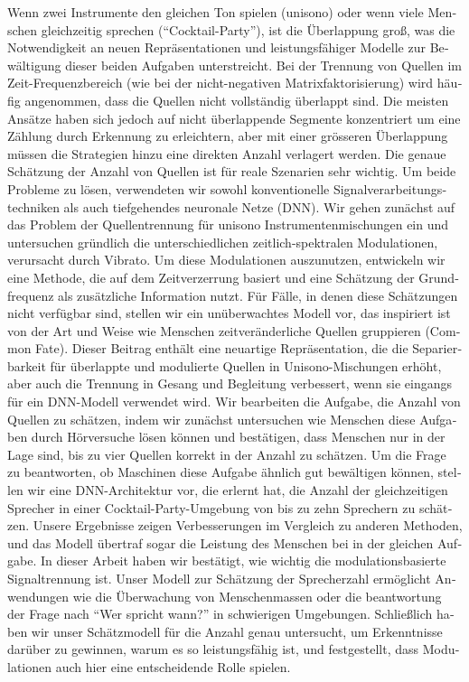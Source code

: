 \begin{otherlanguage}{ngerman}
Wenn zwei Instrumente den gleichen Ton spielen (unisono) oder wenn viele Menschen gleichzeitig sprechen (``Cocktail-Party''), ist die Überlappung groß, was die Notwendigkeit an neuen Repräsentationen und leistungsfähiger Modelle zur Bewältigung dieser beiden Aufgaben unterstreicht.
Bei der Trennung von Quellen im Zeit-Frequenzbereich (wie bei der nicht-negativen Matrixfaktorisierung) wird häufig angenommen, dass die Quellen nicht vollständig überlappt sind.
Die meisten Ansätze haben sich jedoch auf nicht überlappende Segmente konzentriert um eine Zählung durch Erkennung zu erleichtern, aber mit einer grösseren Überlappung müssen die Strategien hinzu eine direkten  Anzahl verlagert werden.
Die genaue Schätzung der Anzahl von Quellen ist für reale Szenarien sehr wichtig.
Um beide Probleme zu lösen, verwendeten wir sowohl konventionelle Signalverarbeitungstechniken als auch tiefgehendes neuronale Netze (DNN).
Wir gehen zunächst auf das Problem der Quellentrennung für unisono Instrumentenmischungen ein und untersuchen gründlich die unterschiedlichen zeitlich-spektralen Modulationen, verursacht durch Vibrato. 
Um diese Modulationen auszunutzen, entwickeln wir eine Methode, die auf dem Zeitverzerrung basiert und eine Schätzung der Grundfrequenz als zusätzliche Information nutzt.
Für Fälle, in denen diese Schätzungen nicht verfügbar sind, stellen wir ein unüberwachtes Modell vor, das inspiriert ist von der Art und Weise  wie Menschen zeitveränderliche Quellen gruppieren (Common Fate).
Dieser Beitrag enthält eine neuartige Repräsentation, die die Separierbarkeit für überlappte und modulierte Quellen in  Unisono-Mischungen erhöht, aber auch die Trennung in Gesang und Begleitung verbessert, wenn sie eingangs für ein DNN-Modell verwendet wird.
Wir bearbeiten die Aufgabe, die Anzahl von Quellen zu schätzen, indem wir zunächst untersuchen wie Menschen diese Aufgaben durch Hörversuche lösen können und bestätigen, dass Menschen nur in der Lage sind, bis zu vier Quellen korrekt in der Anzahl zu schätzen.
Um die Frage zu beantworten, ob Maschinen diese Aufgabe ähnlich gut bewältigen können, stellen wir eine DNN-Architektur vor, die erlernt hat, die Anzahl der gleichzeitigen Sprecher in einer Cocktail-Party-Umgebung von bis zu zehn Sprechern zu schätzen.
Unsere Ergebnisse zeigen Verbesserungen im Vergleich zu anderen Methoden, und das Modell übertraf sogar die Leistung des Menschen bei in der gleichen Aufgabe.
In dieser Arbeit haben wir bestätigt, wie wichtig die modulationsbasierte Signaltrennung ist. 
Unser Modell zur Schätzung der Sprecherzahl ermöglicht Anwendungen wie die Überwachung von Menschenmassen oder die beantwortung der Frage nach ``Wer spricht wann?'' in schwierigen Umgebungen.
Schließlich haben wir unser Schätzmodell für die Anzahl genau untersucht, um Erkenntnisse darüber zu gewinnen, warum es so leistungsfähig ist, und festgestellt, dass Modulationen auch hier eine entscheidende Rolle spielen.
\end{otherlanguage}

\endgroup

\vfill
